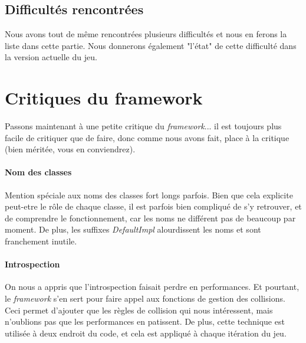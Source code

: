 \documentclass[a4paper,10pt]{article}
\begin{document}


\subsection{Difficultés rencontrées}
Nous avons tout de même rencontrées plusieurs difficultés et nous en ferons la liste dans cette partie. Nous donnerons également "l'état" de cette difficulté dans la version actuelle du jeu.


\section{Critiques du framework }
    Passons maintenant à une petite critique du \textit{framework}... il est toujours plus facile de critiquer que
    de faire, donc comme nous avons fait, place à la critique (bien méritée, vous en conviendrez).

    \paragraph{Nom des classes}
        Mention spéciale aux noms des classes fort longs parfois. Bien que cela explicite peut-etre le rôle
        de chaque classe, il est parfois bien compliqué de s'y retrouver, et de comprendre le fonctionnement,
        car les noms ne différent pas de beaucoup par moment. De plus, les suffixes \textit{DefaultImpl} alourdissent
        les noms et sont franchement inutile.

    \paragraph{Introspection}
        On nous a appris que l'introspection faisait perdre en performances. Et pourtant, le \textit{framework} s'en sert
        pour faire appel aux fonctions de gestion des collisions. Ceci permet d'ajouter que les règles de collision
        qui nous intéressent, mais n'oublions pas que les performances en patissent. De plus, cette technique est
        utilisée à deux endroit du code, et cela est appliqué à chaque itération du jeu.
\end{document}
